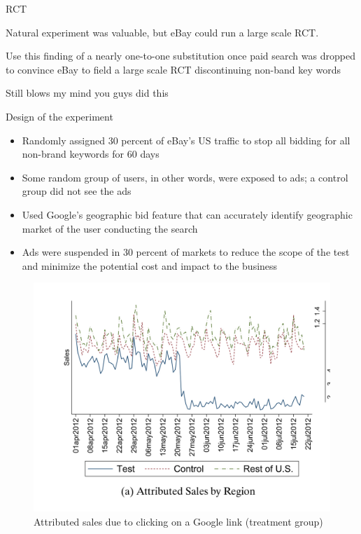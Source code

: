 \documentclass{beamer}
\begin{document}
\begin{frame}{RCT}

Natural experiment was valuable, but eBay could run a large scale RCT.

\bigskip


Use this finding of a nearly one-to-one substitution once paid search was dropped to convince eBay to field a large scale RCT discontinuing non-band key words

\bigskip

Still blows my mind you guys did this


\end{frame}

\begin{frame}{Design of the experiment}

\begin{itemize}
\item Randomly assigned 30 percent of eBay's US traffic to stop all bidding for all non-brand keywords for 60 days
\item Some random group of users, in other words, were exposed to ads; a control group did not see the ads
\item Used Google's geographic bid feature that can accurately identify geographic market of the user conducting the search
\item Ads were suspended in 30 percent of markets to reduce the scope of the test and minimize the potential cost and impact to the business
\end{itemize}

\end{frame}

\begin{frame}

\begin{figure}
\begin{center}
\includegraphics[scale=0.2]{./lecture_includes/tadelis_fig3.png}
\caption{Attributed sales due to clicking on a Google link (treatment group)}
\end{center}
\end{figure}

\end{frame}
\end{document}
